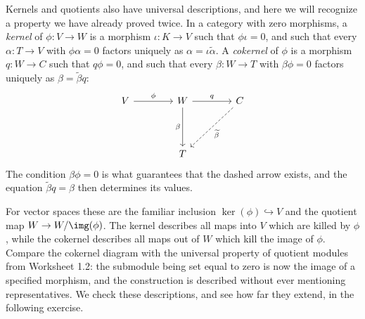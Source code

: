 \documentclass[12pt,reqno]{amsart}
\begin{document}
\hrulefill

Kernels and quotients also have universal descriptions, and here we will recognize a property we have already proved twice. In a category with zero morphisms, a \emph{kernel} of $\phi:V\to W$ is a morphism $\iota:K\to V$ such that $\phi\iota=0$, and such that every $\alpha:T\to V$ with $\phi\alpha=0$ factors uniquely as $\alpha=\iota\widetilde\alpha$. A \emph{cokernel} of $\phi$ is a morphism $q:W\to C$ such that $q\phi=0$, and such that every $\beta:W\to T$ with $\beta\phi=0$ factors uniquely as $\beta=\widetilde\beta q$:
\[
\begin{tikzcd}[row sep=4em,column sep=4em]
V \arrow[r,"\phi"] & W \arrow[r,"q"] \arrow[d,"\beta"'] & C \arrow[dl,dashed,"\widetilde\beta"] \\
& T &
\end{tikzcd}
\]
The condition $\beta\phi=0$ is what guarantees that the dashed arrow exists, and the equation $\widetilde\beta q=\beta$ then determines its values.

For vector spaces these are the familiar inclusion $\ker(\phi)\hookrightarrow V$ and the quotient map $W\to W/\img(\phi)$. The kernel describes all maps into $V$ which are killed by $\phi$, while the cokernel describes all maps out of $W$ which kill the image of $\phi$. Compare the cokernel diagram with the universal property of quotient modules from Worksheet 1.2: the submodule being set equal to zero is now the image of a specified morphism, and the construction is described without ever mentioning representatives. We check these descriptions, and see how far they extend, in the following exercise.

\hrulefill
\end{document}
